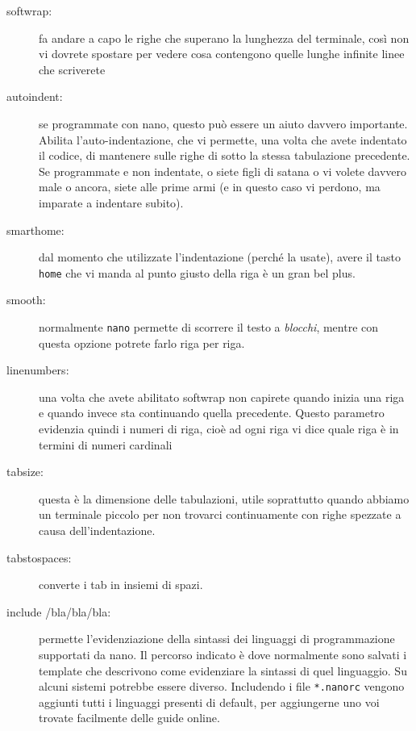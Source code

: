 \documentclass[twoside,italian]{book}
\newcommand{\code}[1]{\texttt{#1}}
\begin{document}
\begin{description}
    \item[softwrap:] fa andare a capo le righe che superano la lunghezza del terminale, così non vi dovrete spostare per vedere cosa contengono quelle lunghe infinite linee che scriverete
    
    \item[autoindent:] se programmate con nano, questo può essere un aiuto davvero importante. Abilita l'auto-indentazione, che vi permette, una volta che avete indentato il codice, di mantenere sulle righe di sotto la stessa tabulazione precedente. Se programmate e non indentate, o siete figli di satana o vi volete davvero male o ancora, siete alle prime armi (e in questo caso vi perdono, ma imparate a indentare subito).
    
    \item[smarthome:] dal momento che utilizzate l'indentazione (perché la usate), avere il tasto \code{home} che vi manda al punto giusto della riga è un gran bel plus.
    
    \item[smooth:] normalmente \code{nano} permette di scorrere il testo a \emph{blocchi}, mentre con questa opzione potrete farlo riga per riga.
    
    \item [linenumbers:] una volta che avete abilitato softwrap non capirete quando inizia una riga e quando invece sta continuando quella precedente. Questo parametro evidenzia quindi i numeri di riga, cioè ad ogni riga vi dice quale riga è in termini di numeri cardinali
    
    \item[tabsize:] questa è la dimensione delle tabulazioni, utile soprattutto quando abbiamo un terminale piccolo per non trovarci continuamente con righe spezzate a causa dell'indentazione.
    
    \item[tabstospaces:] converte i tab in insiemi di spazi.
    
    \item[include /bla/bla/bla:] permette l'evidenziazione della sintassi dei linguaggi di programmazione supportati da nano. Il percorso indicato è dove normalmente sono salvati i template che descrivono come evidenziare la sintassi di quel linguaggio. Su alcuni sistemi potrebbe essere diverso. Includendo i file \code{*.nanorc} vengono aggiunti tutti i linguaggi presenti di default, per aggiungerne uno voi trovate facilmente delle guide online.
\end{description}
    
\end{document}
